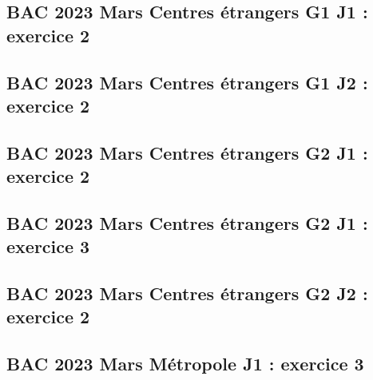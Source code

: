 \documentclass[lang=fr,edition=teacher,layout=sheet]{mxbook}
\begin{document}
\begingroup\endgroup
\par\bigskip
{}\subsection*{BAC 2023 Mars Centres étrangers G1 J1 : exercice 2}
\begingroup\endgroup
\par\bigskip
{}\subsection*{BAC 2023 Mars Centres étrangers G1 J2 : exercice 2}
\begingroup\endgroup
\par\bigskip
{}\subsection*{BAC 2023 Mars Centres étrangers G2 J1 : exercice 2}
\begingroup\endgroup
\par\bigskip
{}\subsection*{BAC 2023 Mars Centres étrangers G2 J1 : exercice 3}
\begingroup\endgroup
\par\bigskip
{}\subsection*{BAC 2023 Mars Centres étrangers G2 J2 : exercice 2}
\begingroup\endgroup
\par\bigskip
{}\subsection*{BAC 2023 Mars Métropole J1 : exercice 3}
\begingroup\endgroup
\end{document}
